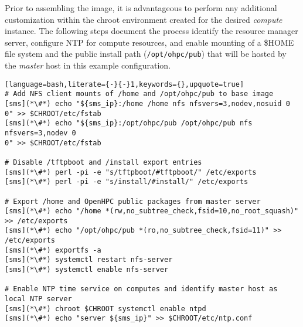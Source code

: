 Prior to assembling the image, it is advantageous to perform any additional
customization within the chroot environment created for the desired {\em
 compute} instance. The following steps document the process identify the
resource manager server, configure NTP for compute resources, and enable \NFS{}
mounting of a \$HOME file system and the public \OHPC{} install path
(\texttt{/opt/ohpc/pub}) that will be hosted by the {\em master} host in this
example configuration.

\vspace*{0.15cm}
\begin{lstlisting}[language=bash,literate={-}{-}1,keywords={},upquote=true]
# Add NFS client mounts of /home and /opt/ohpc/pub to base image
[sms](*\#*) echo "${sms_ip}:/home /home nfs nfsvers=3,nodev,nosuid 0 0" >> $CHROOT/etc/fstab
[sms](*\#*) echo "${sms_ip}:/opt/ohpc/pub /opt/ohpc/pub nfs nfsvers=3,nodev 0
0" >> $CHROOT/etc/fstab

# Disable /tftpboot and /install export entries
[sms](*\#*) perl -pi -e "s/tftpboot/#tftpboot/" /etc/exports
[sms](*\#*) perl -pi -e "s/install/#install/" /etc/exports

# Export /home and OpenHPC public packages from master server
[sms](*\#*) echo "/home *(rw,no_subtree_check,fsid=10,no_root_squash)" >> /etc/exports
[sms](*\#*) echo "/opt/ohpc/pub *(ro,no_subtree_check,fsid=11)" >> /etc/exports
[sms](*\#*) exportfs -a
[sms](*\#*) systemctl restart nfs-server
[sms](*\#*) systemctl enable nfs-server

# Enable NTP time service on computes and identify master host as local NTP server
[sms](*\#*) chroot $CHROOT systemctl enable ntpd
[sms](*\#*) echo "server ${sms_ip}" >> $CHROOT/etc/ntp.conf

\end{lstlisting}

